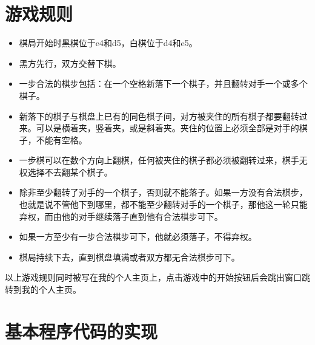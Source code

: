 \documentclass[UTF8]{ctexart}
\begin{document}
\section{游戏规则}
\begin{itemize}
    \item 棋局开始时黑棋位于e4和d5，白棋位于d4和e5。

\end{itemize}
\begin{itemize}
    \item 黑方先行，双方交替下棋。
\end{itemize}
\begin{itemize}
    \item 一步合法的棋步包括：在一个空格新落下一个棋子，并且翻转对手一个或多个棋子。
\end{itemize}
\begin{itemize}
    \item 新落下的棋子与棋盘上已有的同色棋子间，对方被夹住的所有棋子都要翻转过来。可以是横着夹，竖着夹，或是斜着夹。夹住的位置上必须全部是对手的棋子，不能有空格。
\end{itemize}
\begin{itemize}
    \item 一步棋可以在数个方向上翻棋，任何被夹住的棋子都必须被翻转过来，棋手无权选择不去翻某个棋子。
\end{itemize}
\begin{itemize}
    \item 除非至少翻转了对手的一个棋子，否则就不能落子。如果一方没有合法棋步，也就是说不管他下到哪里，都不能至少翻转对手的一个棋子，那他这一轮只能弃权，而由他的对手继续落子直到他有合法棋步可下。
\end{itemize}
\begin{itemize}
    \item 如果一方至少有一步合法棋步可下，他就必须落子，不得弃权。
\end{itemize}
\begin{itemize}
    \item 棋局持续下去，直到棋盘填满或者双方都无合法棋步可下。
\end{itemize}
以上游戏规则同时被写在我的个人主页上，点击游戏中的开始按钮后会跳出窗口跳转到我的个人主页。


\section{基本程序代码的实现}
\end{document}
